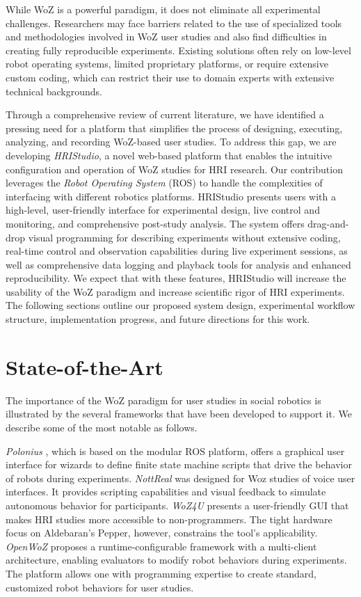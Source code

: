 \documentclass[letterpaper, 10 pt, conference]{ieeeconf}
\begin{document}
While WoZ is a powerful paradigm, it does not eliminate all experimental challenges. Researchers may face barriers related to the use of specialized tools and methodologies involved in WoZ user studies and also find difficulties in creating fully reproducible experiments. Existing solutions often rely on low-level robot operating systems, limited proprietary platforms, or require extensive custom coding, which can restrict their use to domain experts with extensive technical backgrounds.

Through a comprehensive review of current literature, we have identified a pressing need for a platform that simplifies the process of designing, executing, analyzing, and recording WoZ-based user studies. To address this gap, we are developing \emph{HRIStudio},  a novel web-based platform that enables the intuitive configuration and operation of WoZ studies for HRI research. Our contribution leverages the \emph{Robot Operating System} (ROS) to handle the complexities of interfacing with different robotics platforms. HRIStudio presents users with a high-level, user-friendly interface for experimental design, live control and monitoring, and comprehensive post-study analysis. The system offers drag-and-drop visual programming for describing experiments without extensive coding, real-time control and observation capabilities during live experiment sessions, as well as comprehensive data logging and playback tools for analysis and enhanced reproducibility. We expect that with these features, HRIStudio will increase the usability of the  WoZ paradigm and increase scientific rigor of HRI experiments. The following sections outline our proposed system design, experimental workflow structure, implementation progress, and future directions for this work.

\section{State-of-the-Art}

The importance of the WoZ paradigm for user studies in social robotics is illustrated by the several frameworks that have been developed to support it. We describe some of the most notable as follows.

\emph{Polonius}  \cite{Lu2011}, which is based on the modular ROS platform, offers a graphical user interface for wizards to define finite state machine scripts that drive the behavior of robots during experiments. \emph{NottReal} \cite{Porcheron2020} was designed for Woz studies of voice user interfaces. It provides scripting capabilities and visual feedback to simulate autonomous behavior for participants. \emph{WoZ4U}  \cite{Rietz2021} presents a user-friendly GUI that makes HRI studies more accessible to non-programmers. The tight hardware focus on Aldebaran's Pepper, however, constrains the tool's applicability. \emph{OpenWoZ} \cite{Hoffman2016} proposes a runtime-configurable framework with a multi-client architecture, enabling evaluators to modify robot behaviors during experiments. The platform allows one with programming expertise to create standard, customized robot behaviors for user studies.
\end{document}

